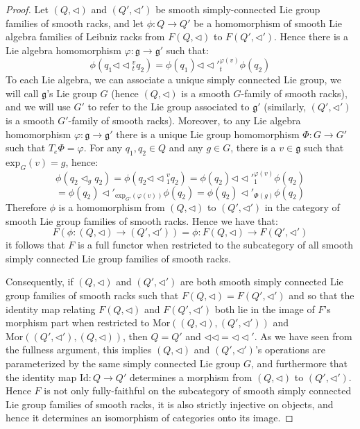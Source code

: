 \documentclass[12pt]{amsart}
\theoremstyle{plain}
\theoremstyle{definition}
\begin{document}
\begin{proof}
 Let $(Q,\triangleleft)$ and $(Q',\triangleleft')$ be smooth simply-connected Lie group families of smooth racks, and let  $\phi : Q \to Q'$ be a homomorphism of smooth Lie algebra families of Leibniz racks from $F(Q,\triangleleft) $ to $F(Q',\triangleleft')$. Hence there is a Lie algebra homomorphism $\varphi: \mathfrak{g} \to \mathfrak{g}'$ such that:
 $$ \phi(q_1{\triangleleft\!\!\triangleleft}_t^v q_2 ) =  \phi(q_1){\triangleleft\!\!\triangleleft'}_t^{\varphi(v)} \phi( q_2)$$
 To each Lie algebra, we can associate a unique simply connected Lie group, we will call $\mathfrak{g}$'s Lie group $G$ (hence $(Q,\triangleleft)$ is a smooth $G$-family of smooth racks), and we will use $G'$ to refer to the Lie group associated to $\mathfrak{g}'$ (similarly, $(Q',\triangleleft')$ is a smooth $G'$-family of smooth racks). Moreover, to any Lie algebra homomorphism $\varphi:\mathfrak{g} \to \mathfrak{g}' $ there is a unique Lie group homomorphism $\Phi:G \to G'$ such that $T_e \Phi = \varphi$. For any $q_1,q_2 \in Q$ and any $g \in G$, there is a $v \in \mathfrak{g}$ such that $\text{exp}_G(v) =g$, hence:
 $$ \phi(q_2\triangleleft_g q_2) =  \phi(q_2{\triangleleft\!\!\triangleleft}_1^v q_2) =  \phi(q_2){\triangleleft\!\!\triangleleft'}_1^{\varphi(v)} \phi(q_2) $$ $$=  \phi(q_2)\triangleleft'_{\text{exp}_{G'}(\varphi(v))}\phi(q_2) = \phi(q_2)\triangleleft'_{\Phi(g)}\phi(q_2) $$
 Therefore $\phi$ is a homomorphism from $(Q,\triangleleft)$ to $(Q',\triangleleft')$ in the category of smooth Lie group families of smooth racks. Hence we have that: $$F(\phi:(Q,\triangleleft)\to (Q',\triangleleft')) = \phi:F(Q,\triangleleft)\to F(Q',\triangleleft')$$ it follows that $F$ is a full functor when restricted to the subcategory of all smooth simply connected Lie group families of smooth racks.
 
 
Consequently, if $(Q,\triangleleft)$ and $(Q',\triangleleft')$ are both smooth simply connected Lie group families of smooth racks such that $F(Q,\triangleleft) = F(Q',\triangleleft')$ and so that the identity map relating $F(Q,\triangleleft) $ and $ F(Q',\triangleleft')$ both lie in the image of $F$'s morphism part when restricted to $\text{Mor}((Q,\triangleleft),(Q',\triangleleft'))$ and $\text{Mor}((Q',\triangleleft'),(Q,\triangleleft))$, then $Q=Q'$ and $\triangleleft\!\!\triangleleft = {\triangleleft\!\!\triangleleft }'$. As we have seen from the fullness argument, this implies $(Q,\triangleleft)$ and $(Q',\triangleleft')$'s operations are parameterized by the same simply connected Lie group $G$, and furthermore that the identity map $\text{Id}:Q \to Q'$ determines a morphism from $(Q,\triangleleft)$ to $(Q',\triangleleft')$. Hence $F$ is not only fully-faithful on the subcategory of smooth simply connected Lie group families of smooth racks, it is also strictly injective on objects, and hence it determines an isomorphism of categories onto its image.


\end{proof}
\end{document}
